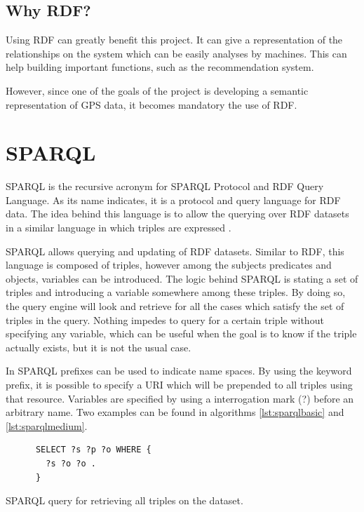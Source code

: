 \subsection*{Why RDF?}

Using RDF can greatly benefit this project. It can give a representation of the relationships on the system which can be easily analyses by machines. This can help building important functions, such as the recommendation system.

However, since one of the goals of the project is developing a semantic representation of GPS data, it becomes mandatory the use of RDF.

\section{SPARQL}\label{sec:sparql}

SPARQL is the recursive acronym for SPARQL Protocol and RDF Query Language. As its name indicates, it is a protocol and query language for RDF data. The idea behind this language is to allow the querying over RDF datasets in a similar language in which triples are expressed \cite{sparqlprotocol}.

SPARQL allows querying \cite{sparqlquery} and updating\cite{sparqlupdate} of RDF datasets. Similar to RDF, this language is composed of triples, however among the subjects predicates and objects, variables can be introduced. The logic behind SPARQL is stating a set of triples and introducing a variable somewhere among these triples. By doing so, the query engine will look and retrieve for all the cases which satisfy the set of triples in the query. Nothing impedes to query for a certain triple without specifying any variable, which can be useful when the goal is to know if the triple actually exists, but it is not the usual case.

In SPARQL prefixes can be used to indicate name spaces. By using the keyword prefix, it is possible to specify a URI which will be prepended to all triples using that resource. Variables are specified by using a interrogation mark (?) before an arbitrary name. Two examples can be found in algorithms \ref{lst:sparqlbasic} and \ref{lst:sparqlmedium}.

\begin{listing}\centering
  \begin{minipage}{.6\textwidth}
    \begin{verbatim}
      SELECT ?s ?p ?o WHERE {
      	?s ?o ?o .
      }
    \end{verbatim}
  \end{minipage}
  \caption{SPARQL query for retrieving all triples on the dataset.}\label{lst:sparqlbasic}
\end{listing}

